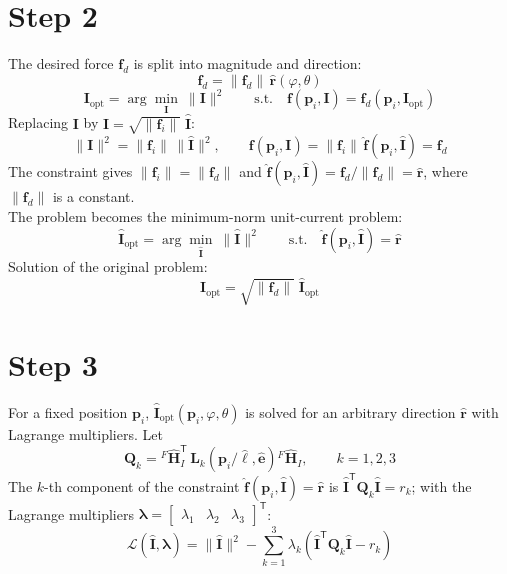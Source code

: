 \documentclass[11pt]{article}
\newcommand{\rh}{\hat{\mathbf{r}}}
\newcommand{\Ij}{\mathbf{I}}
\newcommand{\Ijh}{\hat{\mathbf{I}}}
\newcommand{\fij}{\mathbf{f}_{i}}
\begin{document}
\section*{Step 2}

The desired force $\mathbf{f}_d$ is split into magnitude and direction:
\[
\mathbf{f}_d=\|\mathbf{f}_d\|\,\rh(\varphi,\theta)
\]
\[
\mathbf{I}_{\mathrm{opt}}=\arg\min_{\Ij}\ \|\Ij\|^2
\qquad\text{s.t.}\quad \mathbf{f}\!\left(\mathbf{p}_i,\Ij\right)=\mathbf{f}_d\!\left(\mathbf{p}_i,\mathbf{I}_{\mathrm{opt}}\right)
\]
Replacing $\Ij$ by $\Ij=\sqrt{\|\fij\|}\;\Ijh$:
\[
\|\Ij\|^2=\|\fij\|\,\|\Ijh\|^2,\qquad
\mathbf{f}\!\left(\mathbf{p}_i,\Ij\right)=\|\fij\|\,\hat{\mathbf{f}}\!\left(\mathbf{p}_i,\Ijh\right)=\mathbf{f}_d
\]
The constraint gives $\|\fij\|=\|\mathbf{f}_d\|$ and $\hat{\mathbf{f}}(\mathbf{p}_i,\Ijh)=\mathbf{f}_d/\|\mathbf{f}_d\|=\rh$, where $\|\mathbf{f}_d\|$ is a constant.\\[4pt]
The problem becomes the minimum-norm unit-current problem:
\[
\hat{\mathbf{I}}_{\mathrm{opt}}=\arg\min_{\Ijh}\ \|\Ijh\|^2
\qquad\text{s.t.}\quad \hat{\mathbf{f}}\!\left(\mathbf{p}_i,\Ijh\right)=\rh
\]
Solution of the original problem:
\[
\mathbf{I}_{\mathrm{opt}}=\sqrt{\|\mathbf{f}_d\|}\;\hat{\mathbf{I}}_{\mathrm{opt}}
\]

\section*{Step 3}

For a fixed position $\mathbf{p}_i$, $\hat{\mathbf{I}}_{\mathrm{opt}}(\mathbf{p}_i,\varphi,\theta)$ is solved for an arbitrary direction $\rh$ with Lagrange multipliers. Let
\[
\mathbf{Q}_k={}^{F}\hat{\mathbf{H}}_{I}^{\mathsf T}\,\mathbf{L}_k\!\left(\mathbf{p}_i/\hat{\ell},\hat{\mathbf{e}}\right){}^{F}\hat{\mathbf{H}}_{I},
\qquad k=1,2,3
\]
The $k$-th component of the constraint $\hat{\mathbf{f}}(\mathbf{p}_i,\Ijh)=\rh$ is $\Ijh^{\mathsf T}\mathbf{Q}_k\Ijh=r_k$;
with the Lagrange multipliers $\boldsymbol{\lambda}=\begin{bmatrix}\lambda_1 & \lambda_2 & \lambda_3\end{bmatrix}^{\mathsf T}$:
\[
\mathcal{L}\!\left(\Ijh,\boldsymbol{\lambda}\right)
=\|\Ijh\|^2-\sum_{k=1}^{3}\lambda_k\left(\Ijh^{\mathsf T}\mathbf{Q}_k\Ijh-r_k\right)
\]

\end{document}
